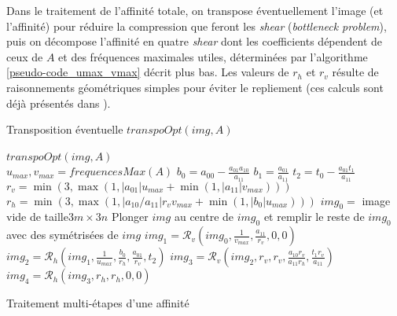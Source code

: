   Dans le traitement de l'affinité totale, on transpose éventuellement l'image (et l'affinité) pour réduire la compression que feront les \textit{shear} (\emph{bottleneck problem}), puis on décompose l'affinité en quatre \textit{shear} dont les coefficients dépendent de ceux de $A$ et des fréquences maximales utiles, déterminées par l'algorithme \ref{pseudo-code_umax_vmax} décrit plus bas. Les valeurs de $r_h$ et $r_v$ résulte de raisonnements géométriques simples pour éviter le repliement (ces calculs sont déjà présentés dans \cite{szeliski2010high}).
  
   \begin{algorithme}
    \caption{Transposition éventuelle $transpoOpt(img,A)$}
    \label{szeliski_transpoopt}
   \end{algorithme}
  
   \begin{algorithme}
    $transpoOpt(img,A)$\;\ \\
    $u_{max}, v_{max} = frequencesMax(A)$\;
	$b_0 = a_{00}-\frac{a_{01}a_{10}}{a_{11}}$\;
	$b_1 = \frac{a_{01}}{a_{11}}$\;
	$t_2 = t_0 - \frac{a_{01}t_1}{a_{11}}$\;
	$r_v = \min(3,\max (1,|a_{01}|u_{max}+\min (1,|a_{11}|v_{max})))$\;
	$r_h = \min(3,\max (1,|a_{10}/a_{11}|r_vv_{max}+\min (1,|b_0|u_{max})))$\;
	$img_0 =$ image vide de taille$3m \times 3n$\;
	Plonger $img$ au centre de $img_0$ et remplir le reste de $img_0$ avec des symétrisées de $img$\;
	$img_1 = \mathcal{R}_v(img_0,\frac{1}{v_{max}},\frac{a_{11}}{r_v},0,0)$\;
	$img_2 = \mathcal{R}_h(img_1,\frac{1}{u_{max}},\frac{b_0}{r_h},\frac{a_{01}}{r_v},t_2)$\;
	$img_3 = \mathcal{R}_v(img_2,r_v,r_v,\frac{a_{10}r_v}{a_{11}r_h},\frac{t_1r_v}{a_{11}})$\;
	$img_4 = \mathcal{R}_h(img_3,r_h,r_h,0,0)$\;
    \caption{Traitement multi-étapes d'une affinité}
    \label{szeliski_affine}
   \end{algorithme}











